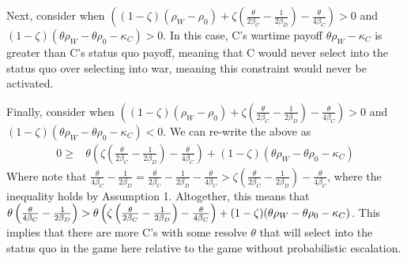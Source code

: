 \documentclass[
]{article}
\begin{document}
Next, consider when \(\left((1-\zeta)(\rho_{W}-\rho_{0})+\zeta\left(\frac{\theta}{2\beta_{C}}-\frac{1}{2\beta_{D}}\right)-\frac{\theta}{4\beta_{C}}\right)>0\) and \((1-\zeta)(\theta\rho_{W}-\theta\rho_{0}-\kappa_{C})>0\). In this case, C's wartime payoff \(\theta\rho_{W}-\kappa_{C}\) is greater than C's status quo payoff, meaning that C would never select into the status quo over selecting into war, meaning this constraint would never be activated.

Finally, consider when \(\left((1-\zeta)(\rho_{W}-\rho_{0})+\zeta\left(\frac{\theta}{2\beta_{C}}-\frac{1}{2\beta_{D}}\right)-\frac{\theta}{4\beta_{C}}\right)>0\) and \((1-\zeta)(\theta\rho_{W}-\theta\rho_{0}-\kappa_{C})<0\). We can re-write the above as
\begin{align*}
  0\geq & \theta\left(\zeta\left(\frac{\theta}{2\beta_{C}}-\frac{1}{2\beta_{D}}\right)-\frac{\theta}{4\beta_{C}}\right)+(1-\zeta)(\theta\rho_{W}-\theta\rho_{0}-\kappa_{C})
  \end{align*}
Where note that \(\frac{\theta}{4\beta_{C}}-\frac{1}{2\beta_{D}}=\frac{\theta}{2\beta_{C}}-\frac{1}{2\beta_{D}}-\frac{\theta}{4\beta_{C}}>\zeta\left(\frac{\theta}{2\beta_{C}}-\frac{1}{2\beta_{D}}\right)-\frac{\theta}{4\beta_{C}}\), where the inequality holds by Assumption 1. Altogether, this means that \(\text{\ensuremath{\theta\left(\frac{\theta}{4\beta_{C}}-\frac{1}{2\beta_{D}}\right)}}>\theta\left(\zeta\left(\frac{\theta}{2\beta_{C}}-\frac{1}{2\beta_{D}}\right)-\frac{\theta}{4\beta_{C}}\right)+(1-\zeta)(\theta\rho_{W}-\theta\rho_{0}-\kappa_{C})\). This implies that there are more C's with some resolve \(\theta\) that will select into the status quo in the game here relative to the game without probabilistic escalation.
\end{document}
